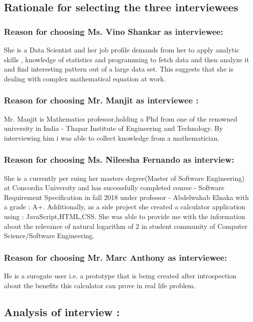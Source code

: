 \documentclass[12pt]{article}
\begin{document}
\subsection{Rationale for selecting the three interviewees}
\subsubsection{Reason for choosing Ms. Vino Shankar as interviewee:}
She is a Data Scientist and her job profile demands from her to apply  analytic skills , knowledge of statistics and programming to fetch data and then analyze it and find interesting pattern out of a large data set. 
This suggests that she is dealing with complex mathematical equation at work.
\subsubsection{Reason for choosing Mr. Manjit as interviewee :}
Mr. Manjit is Mathematics professor,holding a Phd from one of the renowned university in India - Thapar Institute of Engineering and Technology.
By interviewing him i was able to collect knowledge from a mathematician.

\subsubsection{Reason for choosing Ms. Nileesha Fernando as interview:}
She is a currently per suing her masters degree(Master of Software Engineering) at Concordia University and has successfully completed course - Software Requirement Specification in fall 2018 under professor - Abdelwahab Elnaka with a grade : A+. Additionally, as a side project she created a calculator application using : JavaScript,HTML,CSS.
She was able to provide me with the information about the relevance of natural logarithm of 2 in student community of Computer Science/Software Engineering.

\subsubsection{Reason for choosing Mr. Marc Anthony as interviewee:}
He is a surogate user i.e. a prototype that is being created after introspection about the benefits this calculator can prove in real life problem.
\subsection{Analysis of interview :}
\end{document}
